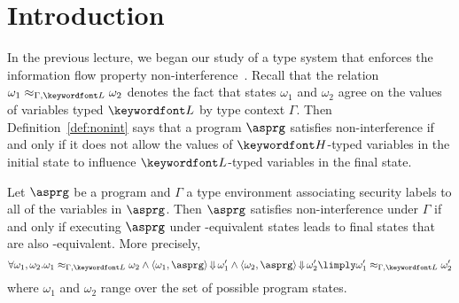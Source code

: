 \documentclass[11pt,twoside]{scrartcl}
\begin{document}
\newcommand{\atrace}{\sigma}%
\newcommand{\stdI}{\dTLint[state=\omega]}%
\newcommand{\Ip}{\dTLint[trace=\atrace]}%
\newcommand{\ws}{\omega}\newcommand{\wt}{\nu}%

\maketitle
\thispagestyle{empty}


\section{Introduction}

In the previous lecture, we began our study of a type system that enforces the information flow property non-interference~\cite{Volpano1996}. Recall that the relation $\omega_1 \approx_{\Gamma,\lowsec} \omega_2$ denotes the fact that states $\omega_1$ and $\omega_2$ agree on the values of variables typed $\lowsec$ by type context $\Gamma$. Then Definition~\ref{def:nonint} says that a program $\asprg$ satisfies non-interference if and only if it does not allow the values of $\hisec$-typed variables in the initial state to influence $\lowsec$-typed variables in the final state.

\begin{definition}
\label{def:nonint}
Let $\asprg$ be a program and $\Gamma$ a type environment associating security labels to all of the variables in $\asprg$. Then $\asprg$ satisfies non-interference under $\Gamma$ if and only if executing $\asprg$ under \lowsec-equivalent states leads to final states that are also \lowsec-equivalent. More precisely,
\begin{equation}
\label{eq:noninterference}
\forall \omega_1,\omega_2 . \omega_1 \approx_{\Gamma,\lowsec} \omega_2 \land 
\langle \omega_1, \asprg\rangle \bigstep \omega_1' \land 
\langle \omega_2, \asprg\rangle \bigstep \omega_2'
\limply
\omega_1' \approx_{\Gamma,\lowsec} \omega_2'
\end{equation}
where $\omega_1$ and $\omega_2$ range over the set of possible program states.
\end{definition}
\end{document}
